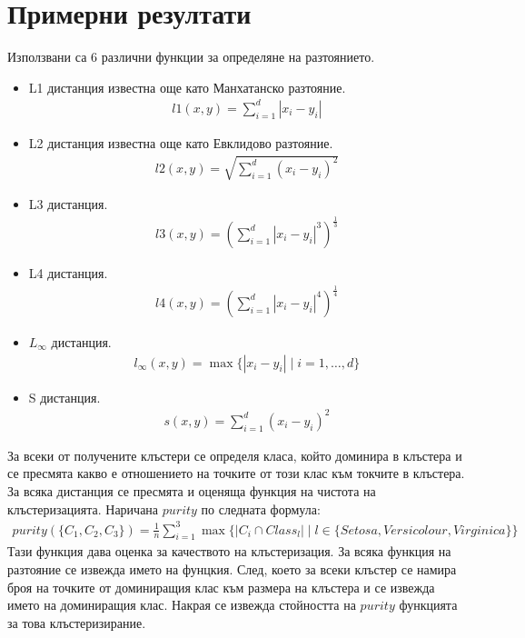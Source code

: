 \documentclass[a4paper, 12pt]{article}
\begin{document}
\section{Примерни резултати}
Използвани са 6 различни функции за определяне на разтоянието.
\begin{itemize}
\item L1 дистанция известна още като Манхатанско разтояние.
\begin{align*}
    l1(x, y) = \displaystyle\sum_{i = 1}^d |x_i - y_i|
\end{align*}
\item L2 дистанция известна още като Евклидово разтояние.
\begin{align*}
    l2(x, y) = \displaystyle\sqrt{\displaystyle\sum_{i = 1}^d (x_i - y_i)^2}
\end{align*}
\item L3 дистанция.
\begin{align*}
    l3(x, y) = \left(\displaystyle\sum_{i = 1}^d |x_i - y_i|^3\right)^\frac{1}{3}
\end{align*}
\item L4 дистанция.
\begin{align*}
    l4(x, y) = \left(\displaystyle\sum_{i = 1}^d |x_i - y_i|^4\right)^\frac{1}{4}
\end{align*}
\item \(L_\infty\) дистанция.
\begin{align*}
    l_\infty(x, y) = \max\{|x_i - y_i| \; | \; i = 1, \dots, d\}
\end{align*}
\item S дистанция.
\begin{align*}
    s(x, y) = \displaystyle\sum_{i = 1}^d (x_i - y_i)^2
\end{align*}
\end{itemize}
За всеки от получените клъстери се определя класа, който доминира в клъстера и се пресмята какво е отношението на точките от този клас към токчите в клъстера.
За всяка дистанция се пресмята и оценяща функция на чистота на клъстеризацията.
Наричана \(purity\) по следната формула:
\begin{align*}
    purity(\{C_1, C_2, C_3\}) = \displaystyle\frac{1}{n}\displaystyle\sum_{i = 1}^3\max\{|C_i \cap Class_l| \; | \; l \in \{Setosa, Versicolour, Virginica\}\}
\end{align*}
Тази функция дава оценка за качеството на клъстеризация.
За всяка функция на разтояние се извежда името на фунцкия.
След, което за всеки клъстер се намира броя на точките от доминиращия клас към размера на клъстера и се извежда името на доминиращия клас.
Накрая се извежда стойността на \(purity\) функцията за това клъстеризирание.
\end{document}
